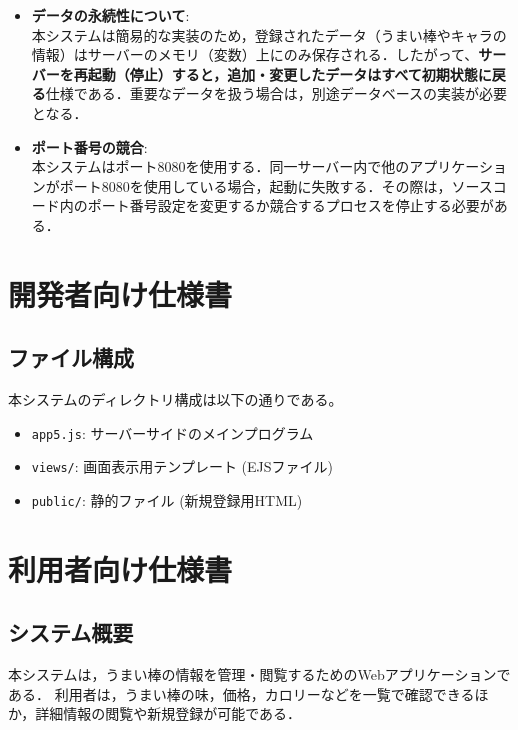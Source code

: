 \documentclass[uplatex,dvipdfmx]{jsarticle}
\begin{document}
\begin{itemize}
    \item \textbf{データの永続性について}: \\
    本システムは簡易的な実装のため，登録されたデータ（うまい棒やキャラの情報）はサーバーのメモリ（変数）上にのみ保存される．したがって、\textbf{サーバーを再起動（停止）すると，追加・変更したデータはすべて初期状態に戻る}仕様である．重要なデータを扱う場合は，別途データベースの実装が必要となる．
    
    \item \textbf{ポート番号の競合}: \\
    本システムはポート8080を使用する．同一サーバー内で他のアプリケーションがポート8080を使用している場合，起動に失敗する．その際は，ソースコード内のポート番号設定を変更するか競合するプロセスを停止する必要がある．
\end{itemize}


\section{開発者向け仕様書}
\subsection{ファイル構成}
本システムのディレクトリ構成は以下の通りである。
\begin{itemize}
    \item \texttt{app5.js}: サーバーサイドのメインプログラム
    \item \texttt{views/}: 画面表示用テンプレート (EJSファイル)
    \item \texttt{public/}: 静的ファイル (新規登録用HTML)
\end{itemize}

\section{利用者向け仕様書}

\subsection{システム概要}
本システムは，うまい棒の情報を管理・閲覧するためのWebアプリケーションである．
利用者は，うまい棒の味，価格，カロリーなどを一覧で確認できるほか，詳細情報の閲覧や新規登録が可能である．
\end{document}
